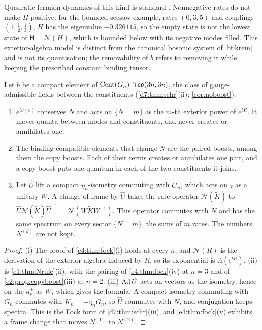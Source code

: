 Quadratic fermion dynamics of this kind is standard \cite{Bravyi05}. Nonnegative rates do not make $H$ positive: for the bounded seesaw example,
rates $(0,3,5)$ and couplings $(1,\tfrac12,\tfrac13)$, $H$ has the eigenvalue $-0.326115$, so the empty state is not the lowest state of
$\mathsf H=\mathcal N(H)$, which is bounded below with its negative modes filled. This exterior-algebra model is distinct from the canonical bosonic
system of \cref{bf:krein} and is not its quantisation; the removability of $b$ refers to removing it while keeping the prescribed constant binding
tensor.

\begin{corollary}
\label{e4:cor:transfer}
Let $b$ be a compact element of $\operatorname{Cent}(G_n)\cap\mathfrak{so}(3n,3n)$, the class of gauge-admissible fields between the constituents (\cref{d7:thm:schr}(ii); \cref{cor:noboost}).
\begin{enumerate}[label=(\roman*),leftmargin=2.2em]
\item $e^{t\sigma(b)}$ conserves $N$ and acts on $\{N=m\}$ as the $m$-th exterior power of $e^{tR}$. It moves quanta between modes and
constituents, and never creates or annihilates one.
\item The binding-compatible elements that change $N$ are the paired boosts, among them the copy boosts. Each of their terms creates or
annihilates one pair, and a copy boost puts one quantum in each of the two constituents it joins.
\item Let $\hat U$ lift a compact $\eta_n$-isometry commuting with $G_n$, which acts on $z$ as a unitary $W$. A change of frame by $\hat U$ takes the
rate operator $\mathcal N(\tilde K)$ to $\hat U\mathcal N(\tilde K)\hat U^{-1}=\mathcal N(W\tilde KW^{-1})$. This operator commutes with $N$ and has the same
spectrum on every sector $\{N=m\}$, the sums of $m$ rates. The numbers $N^{(k)}$ are not kept.
\end{enumerate}
\end{corollary}

\begin{proof}
(i) The proof of \cref{e4:thm:fock}(i) holds at every $n$, and $\mathcal N(R)$ is the derivation of the exterior algebra induced by $R$, so its
exponential is $\Lambda(e^{tR})$. (ii) is \cref{e1:thm:Nrule}(ii), with the pairing of \cref{e4:thm:fock}(iv) at $n=3$ and of
\cref{e2:prop:copyboost}(iii) at $n=2$. (iii) $\operatorname{Ad}\hat U$ acts on vectors as the isometry, hence on the $a^+_p$ as $W$, which gives the formula. A compact isometry commuting with $G_n$
commutes with $K_n=-\eta_nG_n$, so $\hat U$ commutes with $N$, and conjugation keeps spectra. This is the Fock form of \cref{d7:thm:schr}(iii), and \cref{e4:thm:fock}(v) exhibits a frame change that moves $N^{(1)}$ to $N^{(2)}$.
\end{proof}


